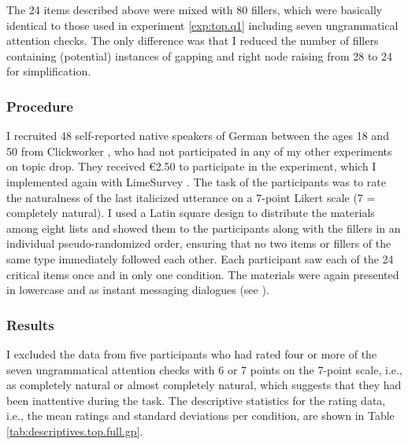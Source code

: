 The 24 items described above were mixed with 80 fillers, which were basically identical to those used in experiment \ref*{exp:top.q1} including seven ungrammatical attention checks.
The only difference was that I reduced the number of fillers containing (potential) instances of gapping and right node raising from 28 to 24 for simplification.

\largerpage[2]
\subsubsection{Procedure}\label{sec:exp.top.s.fv.procedure}
I recruited 48 self-reported native speakers of German between the ages 18 and 50 from Clickworker \citep{clickworker2022}, who had not participated in any of my other experiments on topic drop.
They received €2.50 to participate in the experiment, which I implemented again with LimeSurvey \citep{limesurveygmbh}.
The task of the participants was to rate the naturalness of the last italicized utterance on a 7-point Likert scale (7 = completely natural).
I used a Latin square design to distribute the materials among eight lists and showed them to the participants along with the fillers in an individual pseudo-randomized order, ensuring that no two items or fillers of the same type immediately followed each other.
Each participant saw each of the 24 critical items once and in only one condition. 
The materials were again presented in lowercase and as instant messaging dialogues (see ).

\subsubsection{Results}\label{sec:exp.top.fv.top.results}
I excluded the data from five participants who had rated four or more of the seven ungrammatical attention checks with 6 or 7 points on the 7-point scale, i.e., as completely natural or almost completely natural, which suggests that they had been inattentive during the task.
The descriptive statistics for the rating data, i.e., the mean ratings and standard deviations per condition, are shown in Table \ref{tab:descriptives.top.full.gp}.

